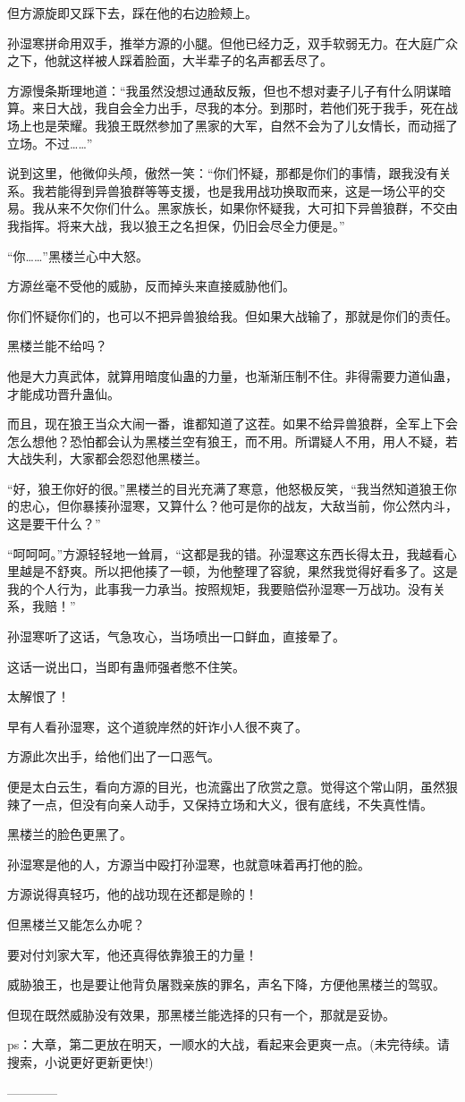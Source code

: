 \begin{this_body}
但方源旋即又踩下去，踩在他的右边脸颊上。

孙湿寒拼命用双手，推举方源的小腿。但他已经力乏，双手软弱无力。在大庭广众之下，他就这样被人踩着脸面，大半辈子的名声都丢尽了。

方源慢条斯理地道：“我虽然没想过通敌反叛，但也不想对妻子儿子有什么阴谋暗算。来日大战，我自会全力出手，尽我的本分。到那时，若他们死于我手，死在战场上也是荣耀。我狼王既然参加了黑家的大军，自然不会为了儿女情长，而动摇了立场。不过……”

说到这里，他微仰头颅，傲然一笑：“你们怀疑，那都是你们的事情，跟我没有关系。我若能得到异兽狼群等等支援，也是我用战功换取而来，这是一场公平的交易。我从来不欠你们什么。黑家族长，如果你怀疑我，大可扣下异兽狼群，不交由我指挥。将来大战，我以狼王之名担保，仍旧会尽全力便是。”

“你……”黑楼兰心中大怒。

方源丝毫不受他的威胁，反而掉头来直接威胁他们。

你们怀疑你们的，也可以不把异兽狼给我。但如果大战输了，那就是你们的责任。

黑楼兰能不给吗？

他是大力真武体，就算用暗度仙蛊的力量，也渐渐压制不住。非得需要力道仙蛊，才能成功晋升蛊仙。

而且，现在狼王当众大闹一番，谁都知道了这茬。如果不给异兽狼群，全军上下会怎么想他？恐怕都会认为黑楼兰空有狼王，而不用。所谓疑人不用，用人不疑，若大战失利，大家都会怨怼他黑楼兰。

“好，狼王你好的很。”黑楼兰的目光充满了寒意，他怒极反笑，“我当然知道狼王你的忠心，但你暴揍孙湿寒，又算什么？他可是你的战友，大敌当前，你公然内斗，这是要干什么？”

“呵呵呵。”方源轻轻地一耸肩，“这都是我的错。孙湿寒这东西长得太丑，我越看心里越是不舒爽。所以把他揍了一顿，为他整理了容貌，果然我觉得好看多了。这是我的个人行为，此事我一力承当。按照规矩，我要赔偿孙湿寒一万战功。没有关系，我赔！”

孙湿寒听了这话，气急攻心，当场喷出一口鲜血，直接晕了。

这话一说出口，当即有蛊师强者憋不住笑。

太解恨了！

早有人看孙湿寒，这个道貌岸然的奸诈小人很不爽了。

方源此次出手，给他们出了一口恶气。

便是太白云生，看向方源的目光，也流露出了欣赏之意。觉得这个常山阴，虽然狠辣了一点，但没有向亲人动手，又保持立场和大义，很有底线，不失真性情。

黑楼兰的脸色更黑了。

孙湿寒是他的人，方源当中殴打孙湿寒，也就意味着再打他的脸。

方源说得真轻巧，他的战功现在还都是赊的！

但黑楼兰又能怎么办呢？

要对付刘家大军，他还真得依靠狼王的力量！

威胁狼王，也是要让他背负屠戮亲族的罪名，声名下降，方便他黑楼兰的驾驭。

但现在既然威胁没有效果，那黑楼兰能选择的只有一个，那就是妥协。

ps：大章，第二更放在明天，一顺水的大战，看起来会更爽一点。(未完待续。请搜索，小说更好更新更快!)

------------

\end{this_body}

